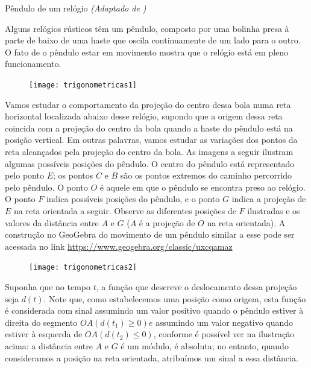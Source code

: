 \begin{task}{Pêndulo de um relógio}
\textit{(Adaptado de \cite{costa2017})}
\label{trig-ativ1}

Alguns relógios rústicos têm um pêndulo, composto por uma bolinha presa à parte de baixo de uma haste que oscila continuamente de um lado para o outro. O fato de o pêndulo estar em movimento mostra que o relógio está em pleno funcionamento.

\begin{figure}[H]
\centering

\texttt{[image: trigonometricas1]}
\end{figure}

Vamos estudar o comportamento da projeção do centro dessa bola numa reta horizontal localizada abaixo desse relógio, supondo que a origem dessa reta coincida com a projeção do centro da bola quando a haste do pêndulo está na posição vertical. Em outras palavras, vamos estudar as variações dos pontos da reta alcançados pela projeção do centro da bola. As imagens a seguir ilustram algumas possíveis posições do pêndulo. O centro do pêndulo está representado pelo ponto $E$; os pontos $C$ e $B$ são os pontos extremos do caminho percorrido pelo pêndulo. O ponto $O$ é aquele em que o pêndulo se encontra preso ao relógio. O ponto $F$ indica possíveis posições do pêndulo, e o ponto $G$ indica a projeção de $E$ na reta orientada a seguir. Observe as diferentes posições de $F$ ilustradas e os valores da distância entre $A$ e $G$ ($A$ é a projeção de $O$ na reta orientada). A construção no GeoGebra do movimento de um pêndulo similar a esse pode ser acessada no link \url{https://www.geogebra.org/classic/uxcqamaz}


\begin{figure}[H]
\centering

\texttt{[image: trigonometricas2]}
\end{figure}

Suponha que no tempo $t$, a função que descreve o deslocamento dessa projeção seja $d(t)$. Note que, como estabelecemos uma posição como origem, esta função é considerada com sinal assumindo um valor positivo quando o pêndulo estiver à direita do segmento $OA(d(t_1)\geq0)e$ assumindo um valor negativo quando estiver à esquerda de $OA(d(t_2)\leq0)$, conforme é possível ver na ilustração acima: a distância entre $A$ e $G$ é um módulo, é absoluta; no entanto, quando consideramos a posição na reta orientada, atribuímos um sinal a essa distância.

\begin{figure}[H]
\centering


\end{figure}
\end{task}
